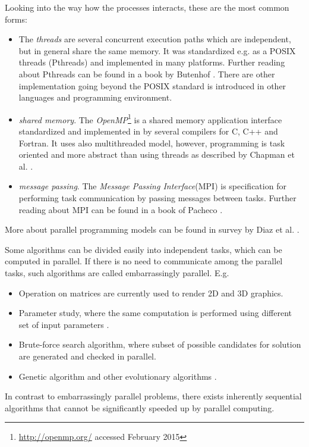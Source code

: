 Looking into the way how the processes interacts, these are the most common forms:
\begin{itemize}
\item{The \emph{threads} are several concurrent execution paths which are independent, but in general share the same memory. It was standardized e.g. as a POSIX threads (Pthreads) and implemented in many platforms.  Further reading about Pthreads can be found in a book by Butenhof \cite{Butenhof1997}. There are other implementation going beyond the POSIX standard is introduced in other languages and programming environment.}
\item{\emph{shared memory}. The \emph{OpenMP}\footnote{\url{http://openmp.org/} accessed February 2015} is a shared memory application interface standardized and implemented in by several compilers for C, C++ and Fortran. It uses also multithreaded model, however, programming is task oriented and more abstract than using threads as described by Chapman et al. \cite{Chapman2008}. }
\item{\emph{message passing}. The \emph{Message Passing Interface}(MPI) is specification for performing task communication by passing messages between tasks. Further reading about MPI can be found in a book of Pacheco \cite{Pacheco1997}.
}
\end{itemize}
More about parallel programming models can be found in survey by Diaz et al. \cite{Diaz2012}.

Some algorithms can be divided easily into independent tasks, which can be computed in parallel. If there is no need to communicate among the parallel tasks, such algorithms are called embarrassingly parallel. E.g. 
\begin{itemize}
\item{Operation on matrices  \cite{Moler1986} are currently used to render 2D and 3D graphics.}
\item{Parameter study, where the same computation is performed using different set of input parameters \cite{Foster1995}.}
\item{Brute-force search algorithm, where subset of possible candidates for solution are generated and checked in parallel.}
\item{Genetic algorithm and other evolutionary algorithms \cite{Cantu-Paz1999}.}
\end{itemize}
In contrast to embarrassingly parallel problems, there exists  inherently sequential algorithms that cannot be significantly speeded up by parallel computing. %

